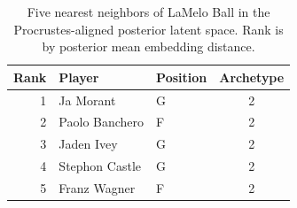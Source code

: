 \begin{table}[htbp]
  \centering\small
  \begin{tabular}{rllc}
    \toprule
    Rank & Player & Position & Archetype \\
    \midrule
    1 & Ja Morant & G & 2 \\
    2 & Paolo Banchero & F & 2 \\
    3 & Jaden Ivey & G & 2 \\
    4 & Stephon Castle & G & 2 \\
    5 & Franz Wagner & F & 2 \\
    \bottomrule
  \end{tabular}
  \caption{Five nearest neighbors of LaMelo Ball in the Procrustes-aligned posterior latent space. Rank is by posterior mean embedding distance.}
  \label{tab:LaMelo_Ball_neighbors}
\end{table}

